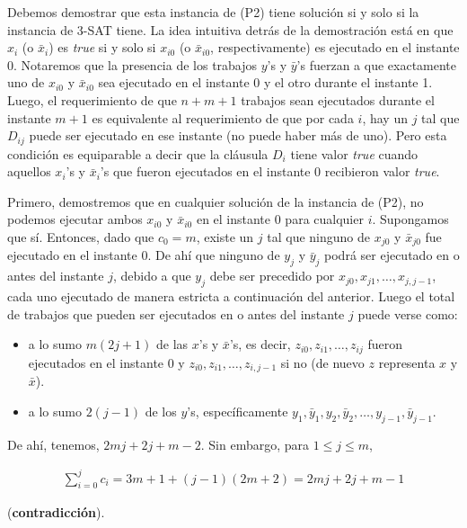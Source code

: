 \documentclass[14pt]{extarticle}
\begin{document}
Debemos demostrar que esta instancia de (P2) tiene solución si y solo si la instancia de 3-SAT tiene. La idea intuitiva detrás de la demostración está en que $x_i$ (o $\bar x_i$) es \textit{true} si y solo si $x_{i0}$ (o $\bar x_{i0}$, respectivamente) es ejecutado en el instante 0. Notaremos que la presencia de los trabajos $y$'s y $\bar y$'s fuerzan a que exactamente uno de $x_{i0}$ y $\bar x_{i0}$ sea ejecutado en el instante 0 y el otro durante el instante 1. Luego, el requerimiento de que $n + m + 1$ trabajos sean ejecutados durante el instante $m + 1$ es equivalente al requerimiento de que por cada $i$, hay un $j$ tal que $D_{ij}$ puede ser ejecutado en ese instante (no puede haber más de uno). Pero esta condición es equiparable a decir que la cláusula $D_i$ tiene valor \textit{true} cuando aquellos $x_i$'s y $\bar x_i$'s que fueron ejecutados en el instante 0 recibieron valor \textit{true}.

Primero, demostremos que en cualquier solución de la instancia de (P2), no podemos ejecutar ambos $x_{i0}$ y $\bar x_{i0}$ en el instante 0 para cualquier $i$. Supongamos que sí. Entonces, dado que $c_0 = m$, existe un $j$ tal que ninguno de $x_{j0}$ y $\bar x_{j0}$ fue ejecutado en el instante 0. De ahí que ninguno de $y_j$ y $\bar y_j$ podrá ser ejecutado en o antes del instante $j$, debido a que $y_j$ debe ser precedido por $x_{j0}, x_{j1}, \ldots, x_{j, j-1}$, cada uno ejecutado de manera estricta a continuación del anterior. Luego el total de trabajos que pueden ser ejecutados en o antes del instante $j$ puede verse como:

\begin{itemize}
    \item a lo sumo $m(2j + 1)$ de las $x$'s y $\bar x$'s, es decir, $z_{i0}, z_{i1}, \ldots, z_{ij}$ fueron ejecutados en el instante 0 y $z_{i0}, z_{i1}, \ldots, z_{i, j-1}$ si no (de nuevo $z$ representa $x$ y $\bar x$).
    \item a lo sumo $2(j - 1)$ de los $y$'s, específicamente $y_1, \bar y_1, y_2, \bar y_2, \ldots, y_{j - 1}, \bar y_{j - 1}$.
\end{itemize}

De ahí, tenemos, $2mj + 2j + m - 2$. Sin embargo, para $1 \leq j \leq m$,

\begin{align*}
\sum_{i=0}^{j} c_i = 3m + 1 + (j - 1)(2m + 2) = 2mj + 2j + m - 1
\end{align*}

(\textbf{contradicción}).
\end{document}
